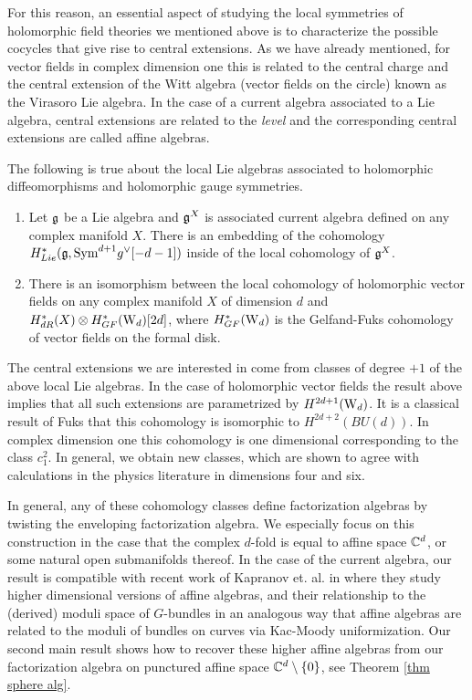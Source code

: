 \documentclass[10pt]{amsart}
\begin{document}
For this reason, an essential aspect of studying the local symmetries of holomorphic field theories we mentioned above is to characterize the possible cocycles that give rise to central extensions. 
As we have already mentioned, for vector fields in complex dimension one this is related to the central charge and the central extension of the Witt algebra (vector fields on the circle) known as the Virasoro Lie algebra.
In the case of a current algebra associated to a Lie algebra, central extensions are related to the {\em level} and the corresponding central extensions are called affine algebras. 

\begin{thm}\label{thm: chap3 1}
The following is true about the local Lie algebras associated to holomorphic diffeomorphisms and holomorphic gauge symmetries.
\begin{enumerate}
\item Let $\mathfrak g$ be a Lie algebra and $\mathfrak g^X$ is associated current algebra defined on any complex manifold $X$. 
There is an embedding of the cohomology $H^*_{Lie}(\mathfrak g , {\rm Sym}^{d+1} g^\vee [-d-1])$ inside of the local cohomology of $\mathfrak g^X$.
\item There is an isomorphism between the local cohomology of holomorphic vector fields on any complex manifold $X$ of dimension $d$ and $H_{dR}^*(X) \otimes H^*_{GF}({\rm W}_d)[2d]$, where  $H^*_{GF}({\rm W}_d)$ is the Gelfand-Fuks cohomology of vector fields on the formal disk.
\end{enumerate}
\end{thm}

The central extensions we are interested in come from classes of degree $+1$ of the above local Lie algebras.
In the case of holomorphic vector fields the result above implies that all such extensions are parametrized by $H^{2d+1}({\rm W}_d)$. 
It is a classical result of Fuks \cite{Fuks} that this cohomology is isomorphic to $H^{2d+2}(BU(d))$. 
In complex dimension one this cohomology is one dimensional corresponding to the class $c_1^2$. 
In general, we obtain new classes, which are shown to agree with calculations in the physics 
literature in dimensions four and six. 

In general, any of these cohomology classes define factorization algebras by twisting the enveloping factorization algebra. 
We especially focus on this construction in the case that the complex $d$-fold is equal to affine space $\mathbb C^d$, or some natural open submanifolds thereof.
In the case of the current algebra, our result is compatible with recent work of Kapranov et. al. in \cite{FHK} where they study higher dimensional versions of affine algebras, and their relationship to the (derived) moduli space of $G$-bundles in an analogous way that affine algebras are related to the moduli of bundles on curves via Kac-Moody uniformization.  
Our second main result shows how to recover these higher affine algebras from our factorization algebra on punctured affine space $\mathbb C^d \setminus\{0\}$, see Theorem \ref{thm sphere alg}.
\end{document}
